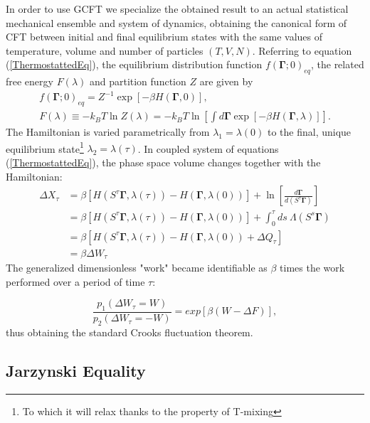 \documentclass[a4paper,12pt]{article}
\begin{document}
In order to use GCFT we specialize the obtained result to an actual statistical mechanical ensemble and system of dynamics, obtaining the canonical form of CFT between initial and final equilibrium states with the same values of temperature, volume and number of particles $(T,V,N)$. 
Referring to equation (\ref{ThermostattedEq}), the equilibrium distribution function $f(\bm{\Gamma};0)_{eq}$, the related free energy $F(\lambda)$ and partition function $Z$ are given by
\begin{equation}
\begin{aligned}
  f(\bm{\Gamma};0)_{eq}=Z^{-1} \exp[-\beta H(\bm{\Gamma},0)],\\
  F(\lambda)\equiv - k_B T \ln Z(\lambda) = -k_B T \ln[\int d\bm{\Gamma} \exp[-\beta H(\bm{\Gamma},\lambda)]].
\end{aligned}
\end{equation}
The Hamiltonian is varied parametrically from $\lambda_1 =\lambda(0)$ to the final, unique equilibrium state\footnote{To which it will relax thanks to the property of T-mixing} $\lambda_2 = \lambda(\tau)$. In coupled system of equations (\ref{ThermostattedEq}), the phase space volume changes together with the Hamiltonian:
\begin{equation}
\begin{aligned}
  \Delta X_\tau &= \beta [ H(S^\tau \bm{\Gamma}, \lambda(\tau))-H(\bm{\Gamma},\lambda(0))] + \ln\left[\frac{d\bm{\Gamma}}{d(S^\tau \bm{\Gamma})}\right]\\
  &=\beta [ H(S^\tau \bm{\Gamma}, \lambda(\tau))-H(\bm{\Gamma},\lambda(0))] + \int_0^\tau ds\ \Lambda(S^s\bm{\Gamma})\\
  &=\beta [ H(S^\tau \bm{\Gamma}, \lambda(\tau))-H(\bm{\Gamma},\lambda(0)) +\Delta Q_\tau] \\
  &=\beta \Delta W_\tau
\end{aligned}
\end{equation}
The generalized dimensionless "work" became identifiable as $\beta$ times the work performed over a period of time $\tau$:

\begin{equation}
\label{CFT}
  \frac{p_1(\Delta W_\tau =W)}{p_2(\Delta W_\tau = -W)} = exp[\beta (W - \Delta F)],
\end{equation}
thus obtaining the standard Crooks fluctuation theorem.

\subsection{Jarzynski Equality}
\end{document}
